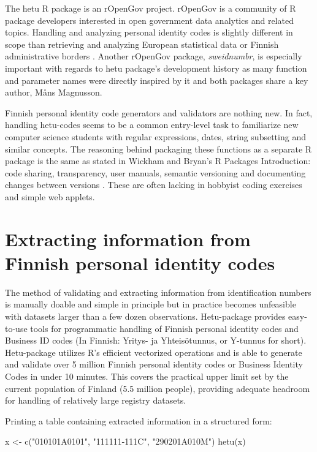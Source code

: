 The hetu R package is an rOpenGov project. rOpenGov is a community of R package developers interested in open government data analytics and related topics. Handling and analyzing personal identity codes is slightly different in scope than retrieving and analyzing European statistical data \citep{RJ-2017-019} or Finnish administrative borders . Another rOpenGov package, \emph{sweidnumbr}, is especially important with regards to hetu package's development history as many function and parameter names were directly inspired by it and both packages share a key author, Måns Magnusson.

Finnish personal identity code generators and validators are nothing new. In fact, handling hetu-codes seems to be a common entry-level task to familiarize new computer science students with regular expressions, dates, string subsetting and similar concepts. The reasoning behind packaging these functions as a separate R package is the same as stated in Wickham and Bryan's R Packages Introduction: code sharing, transparency, user manuals, semantic versioning and documenting changes between versions \citep{wickham}. These are often lacking in hobbyist coding exercises and simple web applets.

\section{Extracting information from Finnish personal identity codes}

The method of validating and extracting information from identification numbers is manually doable and simple in principle but in practice becomes unfeasible with datasets larger than a few dozen observations. Hetu-package provides easy-to-use tools for programmatic handling of Finnish personal identity codes and Business ID codes (In Finnish: Yritys- ja Yhteisötunnus, or Y-tunnus for short). Hetu-package utilizes R’s efficient vectorized operations and is able to generate and validate over 5 million Finnish personal identity codes or Business Identity Codes in under 10 minutes. This covers the practical upper limit set by the current population of Finland (5.5 million people), providing adequate headroom for handling of relatively large registry datasets.

Printing a table containing extracted information in a structured form:

\begin{example}
  x <- c("010101A0101", "111111-111C", "290201A010M")
  hetu(x)
\end{example}

